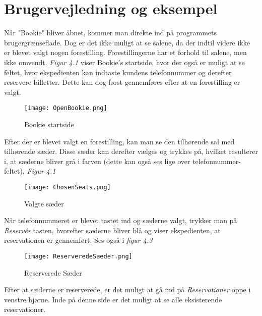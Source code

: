 \chapter{Brugervejledning og eksempel}

Når "Bookie" bliver åbnet, kommer man direkte ind på programmets brugergrænseflade. Dog er det ikke muligt at se salene, da der indtil videre ikke er blevet valgt nogen forestilling. Forestillingerne har et forhold til salene, men ikke omvendt. \textit{Figur 4.1} viser Bookie's startside, hvor der også er muligt at se feltet, hvor ekspedienten kan indtaste kundens telefonnummer og derefter reservere billetter. Dette kan dog først gennemføres efter at en forestilling er valgt. 

\begin{figure}[h]
  \centering
  \texttt{[image: OpenBookie.png]}
  \caption{Bookie startside}
\end{figure}

Efter der er blevet valgt en forestilling, kan man se den tilhørende sal med tilhørende sæder. Disse sæder kan derefter vælges og trykkes på, hvilket resulterer i, at sæderne bliver grå i farven (dette kan også ses lige over telefonnummer-feltet). \textit{Figur 4.1}

\begin{figure} [h]
  \centering
  \texttt{[image: ChosenSeats.png]}
  \caption{Valgte sæder}
\end{figure}

Når telefonnummeret er blevet tastet ind og sæderne valgt, trykker man på \textit{Reservér} tasten, hvorefter sæderne bliver blå og viser ekspedienten, at reservationen er gennemført. Ses også i \textit{figur 4.3}

\begin{figure} [h]
  \centering
  \texttt{[image: ReserveredeSaeder.png]}
  \caption{Reserverede Sæder}
\end{figure}

Efter at sæderne er reserverede, er det muligt at gå ind på \textit{Reservationer} oppe i venstre hjørne. Inde på denne side er det muligt at se alle eksisterende reservationer. 


